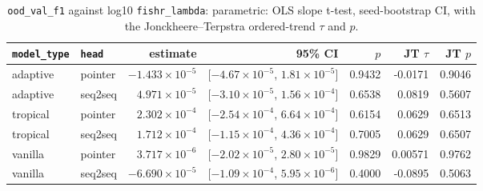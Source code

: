 \documentclass[10pt]{article}
\begin{document}
{\small
\begin{longtable}{llrrrrr}
\caption{\texttt{ood\_val\_f1} against log10 \texttt{fishr\_lambda}: parametric: OLS slope t-test, seed-bootstrap CI, with the Jonckheere--Terpstra ordered-trend $\tau$ and $p$.}\label{tab:trend-ood_val_f1}\\
\toprule
\texttt{model\_type} & \texttt{head} & estimate & 95\% CI & $p$ & JT $\tau$ & JT $p$\\
\midrule
\endhead
adaptive & pointer & $-1.433\times10^{-5}$ & [$-4.67\times10^{-5}$, $1.81\times10^{-5}$] & 0.9432 & -0.0171 & 0.9046\\
adaptive & seq2seq & $4.971\times10^{-5}$ & [$-3.10\times10^{-5}$, $1.56\times10^{-4}$] & 0.6538 & 0.0819 & 0.5607\\
tropical & pointer & $2.302\times10^{-4}$ & [$-2.54\times10^{-4}$, $6.64\times10^{-4}$] & 0.6154 & 0.0629 & 0.6513\\
tropical & seq2seq & $1.712\times10^{-4}$ & [$-1.15\times10^{-4}$, $4.36\times10^{-4}$] & 0.7005 & 0.0629 & 0.6507\\
vanilla & pointer & $3.717\times10^{-6}$ & [$-2.02\times10^{-5}$, $2.80\times10^{-5}$] & 0.9829 & 0.00571 & 0.9762\\
vanilla & seq2seq & $-6.690\times10^{-5}$ & [$-1.09\times10^{-4}$, $5.95\times10^{-6}$] & 0.4000 & -0.0895 & 0.5063\\
\bottomrule
\end{longtable}
}
\end{document}
